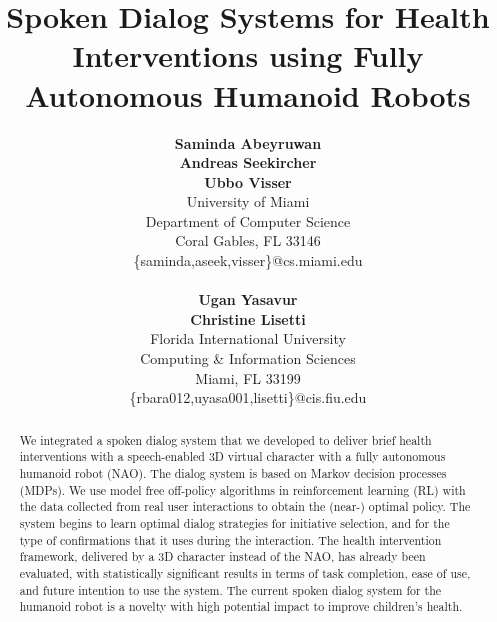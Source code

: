 \documentclass[letterpaper]{article}
\begin{document}
 \begin{sloppy}
%
\title{Spoken Dialog Systems for Health Interventions using Fully Autonomous Humanoid Robots}
 \author{{\Large\bf Saminda Abeyruwan} \\ {\Large\bf Andreas Seekircher} \\ {\Large\bf Ubbo 
 Visser}\\
 University of Miami\\
 Department of Computer Science\\
 Coral Gables, FL 33146\\ 
 \{saminda,aseek,visser\}@cs.miami.edu\\
  \\ {\Large\bf Ugan Yasavur} \\ {\Large\bf Christine Lisetti}\\
 Florida International University\\
 Computing \& Information Sciences\\
 Miami, FL 33199 \\
 \{rbara012,uyasa001,lisetti\}@cis.fiu.edu\\
 }


\maketitle
\begin{abstract}
We integrated a spoken dialog system that we developed to deliver brief health interventions with a 
speech-enabled 3D virtual character with a fully autonomous humanoid robot (NAO). The dialog 
system is based on Markov decision processes (MDPs). We use model free off-policy algorithms in 
reinforcement learning (RL) with the data  collected from real user interactions to obtain the 
(near-) optimal policy. The system begins to learn optimal dialog strategies for initiative 
selection, and for the type of confirmations that it uses during the interaction. The health 
intervention framework, delivered by a 3D character instead of the NAO, has already been evaluated, 
with statistically significant results in terms of task completion, ease of use, and future 
intention to use the system.  The current spoken dialog system for the humanoid robot is a novelty 
with high potential impact to improve children's health.
\end{abstract}



\end{sloppy}
\end{document}
